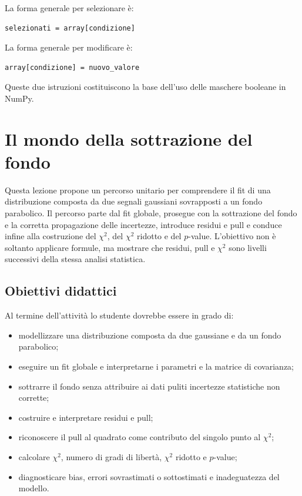 \documentclass[11pt,a4paper]{book}
\begin{document}
La forma generale per selezionare è:

\begin{lstlisting}
selezionati = array[condizione]
\end{lstlisting}

La forma generale per modificare è:

\begin{lstlisting}
array[condizione] = nuovo_valore
\end{lstlisting}

Queste due istruzioni costituiscono la base dell'uso delle maschere booleane in NumPy.


\chapter{Il mondo della sottrazione del fondo}
Questa lezione propone un percorso unitario per comprendere il fit di una distribuzione composta da due segnali gaussiani sovrapposti a un fondo parabolico. Il percorso parte dal fit globale, prosegue con la sottrazione del fondo e la corretta propagazione delle incertezze, introduce residui e pull e conduce infine alla costruzione del $\chi^2$, del $\chi^2$ ridotto e del $p$-value. L'obiettivo non è soltanto applicare formule, ma mostrare che residui, pull e $\chi^2$ sono livelli successivi della stessa analisi statistica.


\section{Obiettivi didattici}
Al termine dell'attività lo studente dovrebbe essere in grado di:
\begin{itemize}
  \item modellizzare una distribuzione composta da due gaussiane e da un fondo parabolico;
  \item eseguire un fit globale e interpretarne i parametri e la matrice di covarianza;
  \item sottrarre il fondo senza attribuire ai dati puliti incertezze statistiche non corrette;
  \item costruire e interpretare residui e pull;
  \item riconoscere il pull al quadrato come contributo del singolo punto al $\chi^2$;
  \item calcolare $\chi^2$, numero di gradi di libertà, $\chi^2$ ridotto e $p$-value;
  \item diagnosticare bias, errori sovrastimati o sottostimati e inadeguatezza del modello.
\end{itemize}
\end{document}
